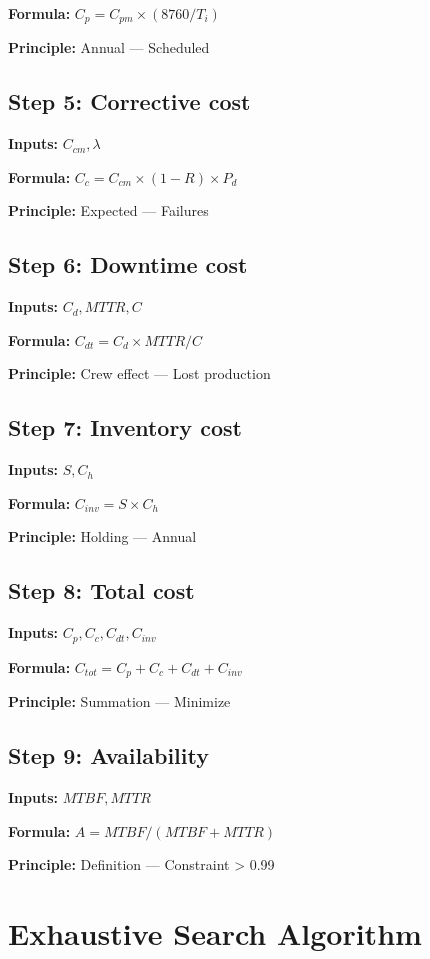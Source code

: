 \documentclass[11pt,twocolumn]{article}
\begin{document}
\textbf{Formula:} $C_p = C_{pm} \times (8760/T_i)$

\textbf{Principle:} Annual --- Scheduled

\subsection*{Step 5: Corrective cost}
\textbf{Inputs:} $C_{cm}, \lambda$

\textbf{Formula:} $C_c = C_{cm} \times (1-R) \times P_d$

\textbf{Principle:} Expected --- Failures

\subsection*{Step 6: Downtime cost}
\textbf{Inputs:} $C_d, MTTR, C$

\textbf{Formula:} $C_{dt} = C_d \times MTTR/C$

\textbf{Principle:} Crew effect --- Lost production

\subsection*{Step 7: Inventory cost}
\textbf{Inputs:} $S, C_h$

\textbf{Formula:} $C_{inv} = S \times C_h$

\textbf{Principle:} Holding --- Annual

\subsection*{Step 8: Total cost}
\textbf{Inputs:} $C_p, C_c, C_{dt}, C_{inv}$

\textbf{Formula:} $C_{tot} = C_p + C_c + C_{dt} + C_{inv}$

\textbf{Principle:} Summation --- Minimize

\subsection*{Step 9: Availability}
\textbf{Inputs:} $MTBF, MTTR$

\textbf{Formula:} $A = MTBF/(MTBF+MTTR)$

\textbf{Principle:} Definition --- Constraint > 0.99


\section{Exhaustive Search Algorithm}
\end{document}
